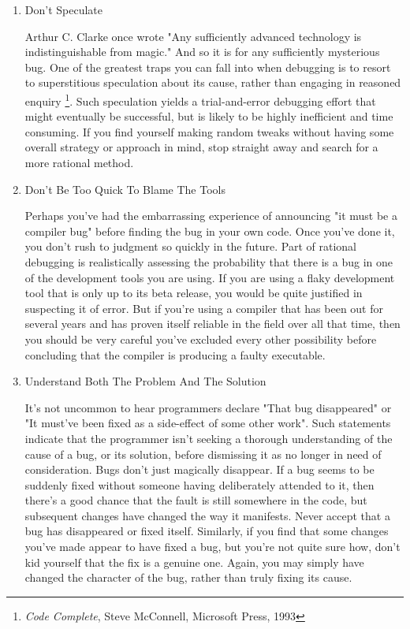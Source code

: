 \documentclass{article}
\begin{document}
\begin{enumerate}
\begin{enumerate}
\item Don't Speculate
\label{sec:orgheadline324}

Arthur C. Clarke once wrote "Any sufficiently advanced technology is
indistinguishable from magic." And so it is for any sufficiently
mysterious bug. One of the greatest traps you can fall into when
debugging is to resort to superstitious speculation about its cause,
rather than engaging in reasoned enquiry \footnote{\emph{Code Complete}, Steve McConnell, Microsoft Press, 1993}. Such speculation yields a
trial-and-error debugging effort that might eventually be successful,
but is likely to be highly inefficient and time consuming. If you find
yourself making random tweaks without having some overall strategy or
approach in mind, stop straight away and search for a more rational
method.

\item Don't Be Too Quick To Blame The Tools
\label{sec:orgheadline325}

Perhaps you've had the embarrassing experience of announcing "it must be
a compiler bug" before finding the bug in your own code. Once you've
done it, you don't rush to judgment so quickly in the future. Part of
rational debugging is realistically assessing the probability that there
is a bug in one of the development tools you are using. If you are using
a flaky development tool that is only up to its beta release, you would
be quite justified in suspecting it of error. But if you're using a
compiler that has been out for several years and has proven itself
reliable in the field over all that time, then you should be very
careful you've excluded every other possibility before concluding that
the compiler is producing a faulty executable.

\item Understand Both The Problem And The Solution
\label{sec:orgheadline326}

It's not uncommon to hear programmers declare "That bug disappeared" or
"It must've been fixed as a side-effect of some other work". Such
statements indicate that the programmer isn't seeking a thorough
understanding of the cause of a bug, or its solution, before dismissing
it as no longer in need of consideration. Bugs don't just magically
disappear. If a bug seems to be suddenly fixed without someone having
deliberately attended to it, then there's a good chance that the fault
is still somewhere in the code, but subsequent changes have changed the
way it manifests. Never accept that a bug has disappeared or fixed
itself. Similarly, if you find that some changes you've made appear to
have fixed a bug, but you're not quite sure how, don't kid yourself that
the fix is a genuine one. Again, you may simply have changed the
character of the bug, rather than truly fixing its cause.


\end{enumerate}
\end{enumerate}
\end{document}
